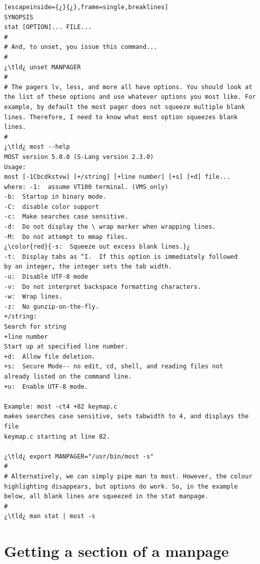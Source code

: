 \begin{lstlisting}[escapeinside={¿}{¿},frame=single,breaklines]
SYNOPSIS
stat [OPTION]... FILE...
#
# And, to unset, you issue this command...
#
¿\tld¿ unset MANPAGER
#
# The pagers lv, less, and more all have options. You should look at the list of these options and use whatever options you most like. For example, by default the most pager does not squeeze multiple blank lines. Therefore, I need to know what most option squeezes blank lines.
#
¿\tld¿ most --help
MOST version 5.0.0 (S-Lang version 2.3.0)
Usage:
most [-1Cbcdkstvw] [+/string] [+line number] [+s] [+d] file...
where: -1:  assume VT100 terminal. (VMS only)
-b:  Startup in binary mode.
-C:  disable color support
-c:  Make searches case sensitive.
-d:  Do not display the \ wrap marker when wrapping lines.
-M:  Do not attempt to mmap files.
¿\color{red}{-s:  Squeeze out excess blank lines.}¿
-t:  Display tabs as ^I.  If this option is immediately followed
by an integer, the integer sets the tab width.
-u:  Disable UTF-8 mode
-v:  Do not interpret backspace formatting characters.
-w:  Wrap lines.
-z:  No gunzip-on-the-fly.
+/string:
Search for string
+line number
Start up at specified line number.
+d:  Allow file deletion.
+s:  Secure Mode-- no edit, cd, shell, and reading files not
already listed on the command line.
+u:  Enable UTF-8 mode.

Example: most -ct4 +82 keymap.c
makes searches case sensitive, sets tabwidth to 4, and displays the file
keymap.c starting at line 82.

¿\tld¿ export MANPAGER="/usr/bin/most -s"
#
# Alternatively, we can simply pipe man to most. However, the colour highlighting disappears, but options do work. So, in the example below, all blank lines are squeezed in the stat manpage.
#
¿\tld¿ man stat | most -s
\end{lstlisting}

\section{Getting a section of a manpage}

